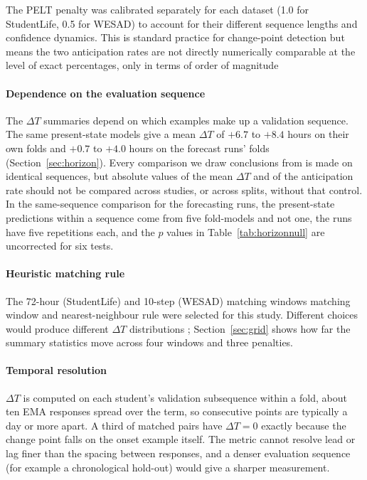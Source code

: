 \documentclass[preprint,12pt,authoryear]{elsarticle}
\newcommand{\dt}{$\Delta T$}
\providecommand{\DIFaddtex}[1]{{\protect\color{blue} \sf #1}} %
\providecommand{\DIFdeltex}[1]{{\protect\color{red} \scriptsize #1}} %
\providecommand{\DIFaddbegin}{} %
\providecommand{\DIFaddend}{} %
\providecommand{\DIFdelbegin}{} %
\providecommand{\DIFdelend}{} %
\providecommand{\DIFadd}[1]{\texorpdfstring{\DIFaddtex{#1}}{#1}} %
\providecommand{\DIFdel}[1]{\texorpdfstring{\DIFdeltex{#1}}{}} %
\newcommand{\DIFscaledelfig}{0.5}
\newlength{\DIFdelgraphicswidth} %
\newlength{\DIFdelgraphicsheight} %
\newcommand{\DIFaddincludegraphics}[2][]{{\color{blue}\fbox{\DIFOincludegraphics[#1]{#2}}}} %
\newcommand{\DIFdelincludegraphics}[2][]{%
\sbox{\DIFdelgraphicsbox}{\DIFOincludegraphics[#1]{#2}}%
\settoboxwidth{\DIFdelgraphicswidth}{\DIFdelgraphicsbox} %
\settoboxtotalheight{\DIFdelgraphicsheight}{\DIFdelgraphicsbox} %
\scalebox{\DIFscaledelfig}{%
\parbox[b]{\DIFdelgraphicswidth}{\usebox{\DIFdelgraphicsbox}\\[-\baselineskip] \rule{\DIFdelgraphicswidth}{0em}}\llap{\resizebox{\DIFdelgraphicswidth}{\DIFdelgraphicsheight}{%
\setlength{\unitlength}{\DIFdelgraphicswidth}%
\begin{picture}(1,1)%
\thicklines\linethickness{2pt} %
{\color[rgb]{1,0,0}\put(0,0){\framebox(1,1){}}}%
{\color[rgb]{1,0,0}\put(0,0){\line( 1,1){1}}}%
{\color[rgb]{1,0,0}\put(0,1){\line(1,-1){1}}}%
\end{picture}%
}\hspace*{3pt}}} %
} %
\DeclareRobustCommand{\DIFaddbegin}{\DIFOaddbegin \let\includegraphics\DIFaddincludegraphics} %
\DeclareRobustCommand{\DIFaddend}{\DIFOaddend \let\includegraphics\DIFOincludegraphics} %
\DeclareRobustCommand{\DIFdelbegin}{\DIFOdelbegin \let\includegraphics\DIFdelincludegraphics} %
\DeclareRobustCommand{\DIFdelend}{\DIFOaddend \let\includegraphics\DIFOincludegraphics} %
\begin{document}
\DIFdelbegin %
\DIFdel{The PELT penalty was
calibrated separately for each dataset (1.0 for StudentLife, 0.5 for
WESAD) to account for their different sequence lengths and confidence
dynamics. This is standard practice for change-point detection but means
the two anticipation rates are not directly numerically comparable at
the level of exact percentages, only in terms of order of magnitude}\DIFdelend \DIFaddbegin \paragraph{Dependence on the evaluation sequence} \DIFadd{The \dt{} summaries
depend on which examples make up a validation sequence. The same
present-state models give a mean \dt{} of $+6.7$ to $+8.4$ hours on
their own folds and $+0.7$ to $+4.0$ hours on the forecast runs' folds
(Section~\ref{sec:horizon}). Every comparison we draw conclusions from
is made on identical sequences, but absolute values of the mean \dt{}
and of the anticipation rate should not be compared across studies, or
across splits, without that control. In the same-sequence comparison
for the forecasting runs, the present-state predictions within a
sequence come from five fold-models and not one, the runs have five
repetitions each, and the $p$ values in Table~\ref{tab:horizonnull} are
uncorrected for six tests}\DIFaddend .

\DIFdelbegin %
\DIFdelend \DIFaddbegin \paragraph{Heuristic matching rule} \DIFaddend The 72-hour \DIFdelbegin \DIFdel{(StudentLife) and 10-step
(WESAD) matching windows }\DIFdelend \DIFaddbegin \DIFadd{matching window }\DIFaddend and
nearest-neighbour rule were selected for this study. Different choices
\DIFdelbegin \DIFdel{would }\DIFdelend produce different \dt{} distributions\DIFaddbegin \DIFadd{; Section~\ref{sec:grid} shows how
far the summary statistics move across four windows and three
penalties.
}

\paragraph{Temporal resolution} \DIFadd{\dt{} is computed on each student's
validation subsequence within a fold, about ten EMA responses spread
over the term, so consecutive points are typically a day or more apart.
A third of matched pairs have $\Delta T = 0$ exactly because the change
point falls on the onset example itself. The metric cannot resolve
lead or lag finer than the spacing between responses, and a denser
evaluation sequence (for example a chronological hold-out) would give a
sharper measurement.
}
\end{document}
